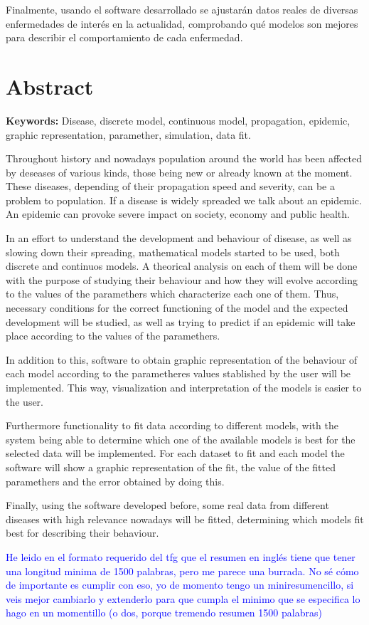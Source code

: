 Finalmente, usando el software desarrollado se ajustarán datos reales de diversas enfermedades de interés en la actualidad, comprobando qué modelos son mejores para describir el comportamiento de cada enfermedad.



\chapter*{Abstract}

\textbf{Keywords: } Disease, discrete model, continuous model, propagation, epidemic, graphic representation, paramether, simulation, data fit.

Throughout history and nowadays population around the world has been affected by deseases of various kinds, those being new or already known at the moment. These diseases, depending of their propagation speed and severity, can be a problem to population. If a disease is widely spreaded we talk about an epidemic. An epidemic can provoke severe impact on society, economy and public health.

In an effort to understand the development and behaviour of disease, as well as slowing down their spreading, mathematical models started to be used, both discrete and continuos models. A theorical analysis on each of them will be done with the purpose of studying their behaviour and how they will evolve according to the values of the paramethers which characterize each one of them. Thus, necessary conditions for the correct functioning of the model and the expected development will be studied, as well as trying to predict if an epidemic will take place according to the values of the paramethers.

In addition to this, software  to obtain graphic representation of the behaviour of each model according to the parametheres values stablished by the user will be implemented. This way, visualization and interpretation of the models is easier to the user.

Furthermore functionality to fit data according to different models, with the system being able to determine which one of the available models is best for the selected data will be implemented. For each dataset to fit and each model the software will show a graphic representation of the fit, the value of the fitted paramethers and the error obtained by doing this.

Finally, using the software developed before, some real data from different diseases with high relevance nowadays will be fitted, determining which models fit best for describing their behaviour.

\textcolor{blue}{He leido en el formato requerido del tfg que el resumen en inglés tiene que tener una longitud minima de 1500 palabras, pero me parece una burrada. No sé cómo de importante es cumplir con eso, yo de momento tengo un miniresumencillo, si veis mejor cambiarlo y extenderlo para que cumpla el minimo que se especifica lo hago en un momentillo (o dos, porque tremendo resumen 1500 palabras)}

